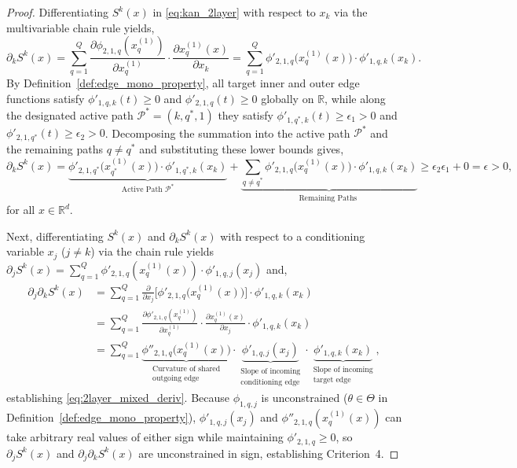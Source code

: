 \documentclass[11pt,a4paper]{article}
\theoremstyle{plain}
\theoremstyle{definition}
\theoremstyle{remark}
\begin{document}
\begin{proof}
Differentiating $S^k(x)$ in \eqref{eq:kan_2layer} with respect to $x_k$ via the multivariable chain rule yields,
\begin{equation}
    \partial_k S^k(x) = \sum_{q=1}^Q \frac{\partial \phi_{2, 1, q}(x^{(1)}_q)}{\partial x^{(1)}_q} \cdot \frac{\partial x^{(1)}_q(x)}{\partial x_k} = \sum_{q=1}^Q \phi'_{2, 1, q}\big(x^{(1)}_q(x)\big) \cdot \phi'_{1, q, k}(x_k).
\end{equation}
By Definition~\ref{def:edge_mono_property}, all target inner and outer edge functions satisfy $\phi'_{1, q, k}(t) \ge 0$ and $\phi'_{2, 1, q}(t) \ge 0$ globally on $\mathbb{R}$, while along the designated active path $\mathcal{P}^* = (k, q^*, 1)$ they satisfy $\phi'_{1, q^*, k}(t) \ge \epsilon_1 > 0$ and $\phi'_{2, 1, q^*}(t) \ge \epsilon_2 > 0$. Decomposing the summation into the active path $\mathcal{P}^*$ and the remaining paths $q \neq q^*$ and substituting these lower bounds gives,
\begin{equation}
    \partial_k S^k(x) = \underbrace{\phi'_{2, 1, q^*}\big(x^{(1)}_{q^*}(x)\big) \cdot \phi'_{1, q^*, k}(x_k)}_{\text{Active Path } \mathcal{P}^*} + \underbrace{\sum_{q \neq q^*} \phi'_{2, 1, q}\big(x^{(1)}_q(x)\big) \cdot \phi'_{1, q, k}(x_k)}_{\text{Remaining Paths }} \ge \epsilon_2 \epsilon_1 + 0 = \epsilon > 0,
\end{equation}
for all $x \in \mathbb{R}^d$.

Next, differentiating $S^k(x)$ and $\partial_k S^k(x)$ with respect to a conditioning variable $x_j$ ($j \neq k$) via the chain rule yields $\partial_j S^k(x) = \sum_{q=1}^Q \phi'_{2, 1, q}(x^{(1)}_q(x)) \cdot \phi'_{1, q, j}(x_j)$ and,
\begin{align}
    \partial_j \partial_k S^k(x) &= \sum_{q=1}^Q \frac{\partial}{\partial x_j}\Big[ \phi'_{2, 1, q}\big(x^{(1)}_q(x)\big) \Big] \cdot \phi'_{1, q, k}(x_k) \nonumber \\
    &= \sum_{q=1}^Q \frac{\partial \phi'_{2, 1, q}(x^{(1)}_q)}{\partial x^{(1)}_q} \cdot \frac{\partial x^{(1)}_q(x)}{\partial x_j} \cdot \phi'_{1, q, k}(x_k) \nonumber \\
    &= \sum_{q=1}^Q \underbrace{\phi''_{2, 1, q}\big(x^{(1)}_q(x)\big)}_{\substack{\text{Curvature of shared} \\ \text{outgoing edge}}} \cdot \underbrace{\phi'_{1, q, j}(x_j)}_{\substack{\text{Slope of incoming} \\ \text{conditioning edge}}} \cdot \underbrace{\phi'_{1, q, k}(x_k)}_{\substack{\text{Slope of incoming} \\ \text{target edge}}},
\end{align}
establishing \eqref{eq:2layer_mixed_deriv}. Because $\phi_{1, q, j}$ is unconstrained ($\theta \in \Theta$ in Definition~\ref{def:edge_mono_property}), $\phi'_{1, q, j}(x_j)$ and $\phi''_{2, 1, q}(x^{(1)}_q(x))$ can take arbitrary real values of either sign while maintaining $\phi'_{2, 1, q} \ge 0$, so $\partial_j S^k(x)$ and $\partial_j \partial_k S^k(x)$ are unconstrained in sign, establishing Criterion~4.
\end{proof}
\end{document}
